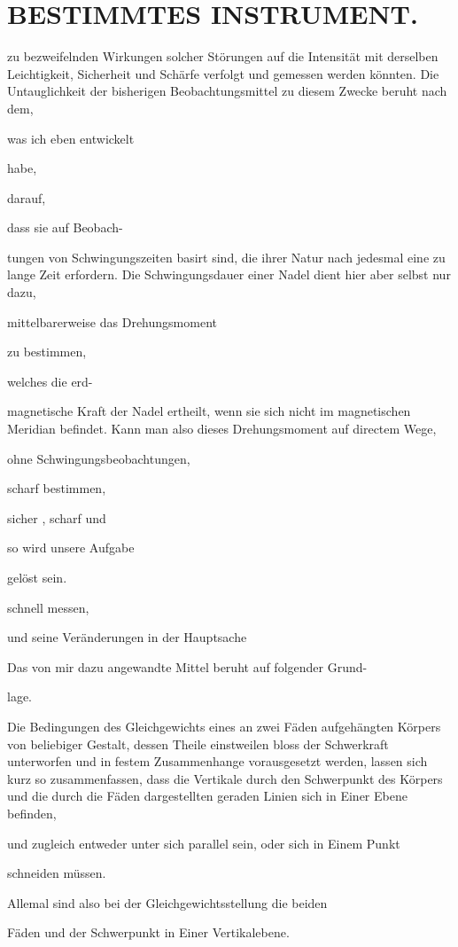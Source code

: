 \documentclass[12pt,a4paper]{article}
\begin{document}
\section*{BESTIMMTES INSTRUMENT.}
zu bezweifelnden Wirkungen solcher Störungen auf die Intensität mit derselben Leichtigkeit, Sicherheit und Schärfe verfolgt und gemessen werden könnten. Die Untauglichkeit der bisherigen Beobachtungsmittel zu diesem Zwecke beruht nach dem,

was ich eben entwickelt

habe,

darauf,

dass sie auf Beobach-

tungen von Schwingungszeiten basirt sind, die ihrer Natur nach jedesmal eine zu lange Zeit erfordern. Die Schwingungsdauer einer Nadel dient hier aber selbst nur dazu,

mittelbarerweise das Drehungsmoment

zu bestimmen,

welches die erd-

magnetische Kraft der Nadel ertheilt, wenn sie sich nicht im magnetischen Meridian befindet. Kann man also dieses Drehungsmoment auf directem Wege,

ohne Schwingungsbeobachtungen,

scharf bestimmen,

sicher , scharf und

so wird unsere Aufgabe

gelöst sein.

schnell messen,

und seine Veränderungen in der Hauptsache

Das von mir dazu angewandte Mittel beruht auf folgender Grund-

lage.

Die Bedingungen des Gleichgewichts eines an zwei Fäden aufgehängten Körpers von beliebiger Gestalt, dessen Theile einstweilen bloss der Schwerkraft unterworfen und in festem Zusammenhange vorausgesetzt werden, lassen sich kurz so zusammenfassen, dass die Vertikale durch den Schwerpunkt des Körpers und die durch die Fäden dargestellten geraden Linien sich in Einer Ebene befinden,

und zugleich entweder unter sich parallel sein, oder sich in Einem Punkt

schneiden müssen.

Allemal sind also bei der Gleichgewichtsstellung die beiden

Fäden und der Schwerpunkt in Einer Vertikalebene.
\end{document}
